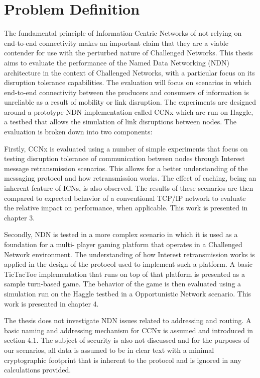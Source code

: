 \documentclass[a4paper,12pt]{report}      %
\begin{document}
\pagebreak
\chapter{Problem Definition}

The fundamental principle of Information-Centric Networks of not relying on end-to-end connectivity
makes an important claim that they are a viable contender for use with the perturbed nature of
Challenged Networks. This thesis aims to evaluate the performance of the Named Data Networking
(NDN) architecture in the context of Challenged Networks, with a particular focus on its disruption
tolerance capabilities. The evaluation will focus on scenarios in which end-to-end connectivity between
the producers and consumers of information is unreliable as a result of mobility or link disruption.
The experiments are designed around a prototype NDN implementation called CCNx which are run on
Haggle, a testbed that allows the simulation of link disruptions between nodes. The evaluation is
broken down into two components:

Firstly, CCNx is evaluated using a number of simple experiments that focus on testing disruption
tolerance of communication between nodes through Interest message retransmission scenarios. This
allows for a better understanding of the messaging protocol and how retransmission works. The effect
of caching, being an inherent feature of ICNs, is also observed. The results of these scenarios are then
compared to expected behavior of a conventional TCP/IP network to evaluate the relative impact on
performance, when applicable. This work is presented in chapter 3.

Secondly, NDN is tested in a more complex scenario in which it is used as a foundation for a multi-
player gaming platform that operates in a Challenged Network environment. The understanding of how
Interest retransmission works is applied in the design of the protocol used to implement such a
platform. A basic TicTacToe implementation that runs on top of that platform is presented as a sample
turn-based game. The behavior of the game is then evaluated using a simulation run on the Haggle
testbed in a Opportunistic Network scenario. This work is presented in chapter 4.

The thesis does not investigate NDN issues related to addressing and routing. A basic naming and
addressing mechanism for CCNx is assumed and introduced in section 4.1. The subject of security is
also not discussed and for the purposes of our scenarios, all data is assumed to be in clear text with a
minimal cryptographic footprint that is inherent to the protocol and is ignored in any calculations
provided.
\end{document}
